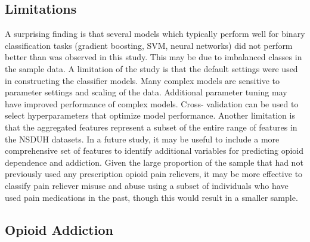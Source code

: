\documentclass[sigconf]{acmart}
\begin{document}

\subsection{Limitations}

A surprising finding is that several models which typically perform well for 
binary classification tasks (gradient boosting, SVM, neural networks) did not 
perform better than was observed in this study. This may be due to imbalanced 
classes in the sample data. A limitation of the study is that the default 
settings were used in constructing the classifier models. Many complex models 
are sensitive to parameter settings and scaling of the data. Additional 
parameter tuning may have improved performance of complex models. Cross-
validation can be used to select hyperparameters that optimize model 
performance. Another limitation is that the aggregated features represent a 
subset of the entire range of features in the NSDUH datasets. In a future study, 
it may be useful to include a more comprehensive set of features to identify 
additional variables for predicting opioid dependence and addiction. 
Given the large proportion of the sample that had not previously used any
prescription opioid pain relievers, it may be more effective to classify 
pain reliever misuse and abuse using a subset of individuals who have used 
pain medications in the past, though this would result in a smaller sample.


\subsection{Opioid Addiction}
\end{document}
